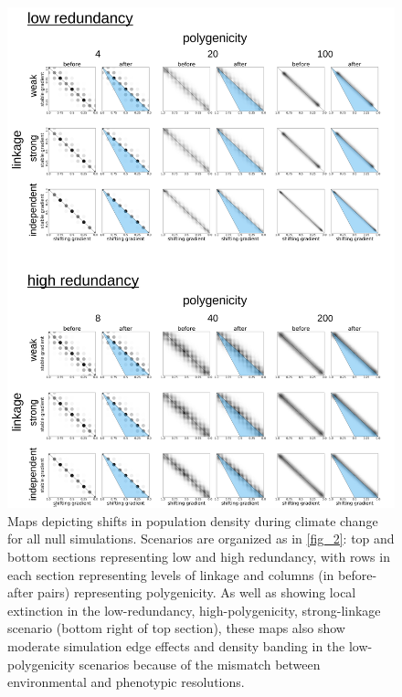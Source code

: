 \documentclass[9pt,twocolumn,twoside,lineno]{pnas-new}
\begin{document}
\begin{figure}
\centering
\includegraphics[width=.8\linewidth]{pub/figs/FIG_S3_phenotypic_shift_null.jpg}
    \caption{Maps depicting shifts in population density during climate change for all null simulations. Scenarios are organized as in \ref{fig_2}: top and bottom sections representing low and high redundancy, with rows in each section representing levels of linkage and columns (in before-after pairs) representing polygenicity. As well as showing local extinction in the low-redundancy, high-polygenicity, strong-linkage scenario (bottom right of top section), these maps also show moderate simulation edge effects and density banding in the low-polygenicity scenarios because of the mismatch between environmental and phenotypic resolutions.}
\label{fig:fig_s3}
\end{figure}
\end{document}
